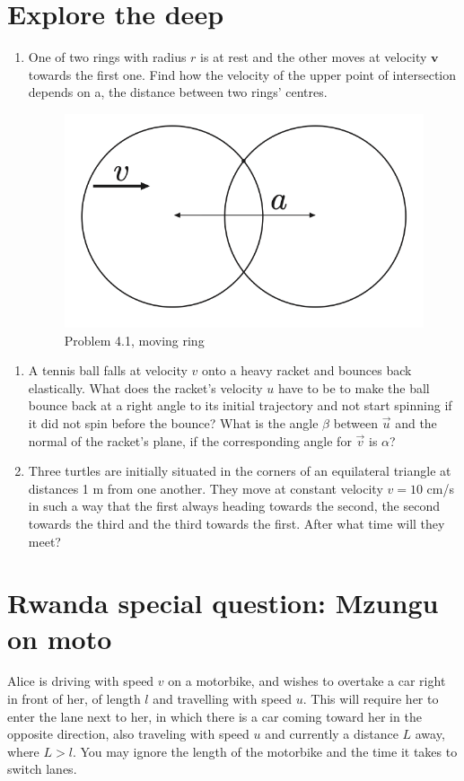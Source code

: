 \documentclass{article}
\begin{document}
\section{Explore the deep}
\begin{enumerate}
    \item One of two rings with radius $r$ is at rest and the other moves at velocity $\mathbf{v}$ towards the first one. Find how the velocity of the upper point of intersection depends on a, the distance between two rings’ centres.
\begin{figure}
    \centering
    \includegraphics[width=0.5\linewidth]{Screenshot 2024-09-06 at 16.41.18.png}
    \caption{Problem 4.1, moving ring}
    \label{fig:enter-label}

\end{figure}
\end{enumerate}
\begin{enumerate}[resume]
    \item A tennis ball falls at velocity $v$ onto a heavy racket and bounces back elastically. What does the racket’s velocity $u$ have to be to make the ball bounce back at a right angle to its initial trajectory and not start spinning if it did not spin before the bounce? What is the angle $\beta$ between $\vec{u}$ and the normal of the racket’s plane, if the corresponding angle for $\vec{v}$ is $\alpha$?
    \item Three turtles are initially situated in the corners of an equilateral triangle at distances 1 m from one another. They move at constant velocity $v = 10$ cm/s in such a way that the first always heading towards the second, the second towards the third and the third towards the first. After what time will they meet?
\end{enumerate}
\section{Rwanda special question: Mzungu on moto}
Alice is driving with speed $v$ on a motorbike, and wishes to overtake a car right in front of her, of length $l$ and travelling with speed $u$. This will require her to enter the lane next to her, in which there is a car coming toward her in the opposite direction, also traveling with speed $u$ and currently a distance $L$ away, where $L > l$. You may ignore the length of the motorbike and the time it takes to switch lanes.
\end{document}
